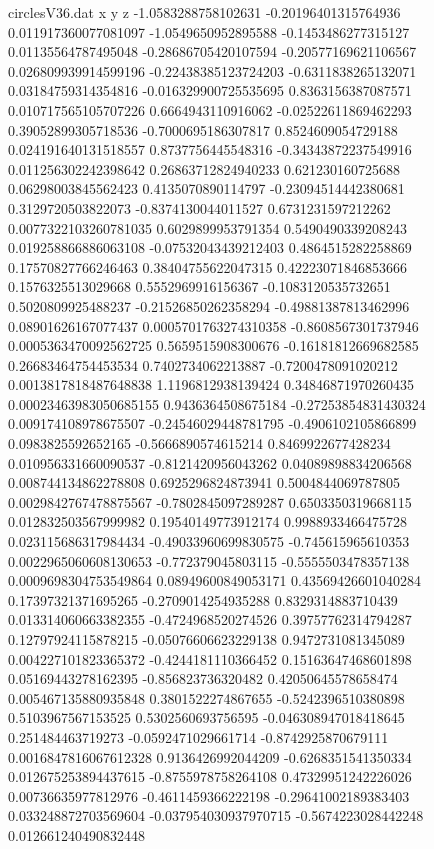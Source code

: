 \begin{filecontents}{circlesV36.dat}
x y z
-1.0583288758102631	-0.20196401315764936	0.011917360077081097
-1.0549650952895588	-0.1453486277315127	0.01135564787495048
-0.28686705420107594	-0.20577169621106567	0.026809939914599196
-0.22438385123724203	-0.6311838265132071	0.03184759314354816
-0.016329900725535695	0.8363156387087571	0.010717565105707226
0.6664943110916062	-0.02522611869462293	0.39052899305718536
-0.7000695186307817	0.8524609054729188	0.024191640131518557
0.8737756445548316	-0.34343872237549916	0.011256302242398642
0.26863712824940233	0.621230160725688	0.06298003845562423
0.4135070890114797	-0.23094514442380681	0.3129720503822073
-0.8374130044011527	0.6731231597212262	0.0077322103260781035
0.6029899953791354	0.5490490339208243	0.019258866886063108
-0.07532043439212403	0.4864515282258869	0.17570827766246463
0.38404755622047315	0.42223071846853666	0.1576325513029668
0.5552969916156367	-0.1083120535732651	0.5020809925488237
-0.21526850262358294	-0.49881387813462996	0.08901626167077437
0.0005701763274310358	-0.8608567301737946	0.0005363470092562725
0.5659515908300676	-0.16181812669682585	0.26683464754453534
0.7402734062213887	-0.7200478091020212	0.0013817818487648838
1.1196812938139424	0.34846871970260435	0.00023463983050685155
0.9436364508675184	-0.27253854831430324	0.009174108978675507
-0.24546029448781795	-0.4906102105866899	0.0983825592652165
-0.5666890574615214	0.8469922677428234	0.010956331660090537
-0.8121420956043262	0.04089898834206568	0.008744134862278808
0.6925296824873941	0.5004844069787805	0.0029842767478875567
-0.7802845097289287	0.6503350319668115	0.012832503567999982
0.19540149773912174	0.9988933466475728	0.023115686317984434
-0.49033960699830575	-0.745615965610353	0.0022965060608130653
-0.772379045803115	-0.5555503478357138	0.0009698304753549864
0.08949600849053171	0.43569426601040284	0.17397321371695265
-0.2709014254935288	0.8329314883710439	0.013314060663382355
-0.4724968520274526	0.39757762314794287	0.12797924115878215
-0.05076606623229138	0.9472731081345089	0.004227101823365372
-0.4244181110366452	0.15163647468601898	0.05169443278162395
-0.856823736320482	0.42050645578658474	0.005467135880935848
0.3801522274867655	-0.5242396510380898	0.5103967567153525
0.5302560693756595	-0.046308947018418645	0.251484463719273
-0.0592471029661714	-0.8742925870679111	0.0016847816067612328
0.9136426992044209	-0.6268351541350334	0.012675253894437615
-0.8755978758264108	0.47329951242226026	0.00736635977812976
-0.4611459366222198	-0.29641002189383403	0.033248872703569604
-0.037954030937970715	-0.5674223028442248	0.012661240490832448

\end{filecontents}
